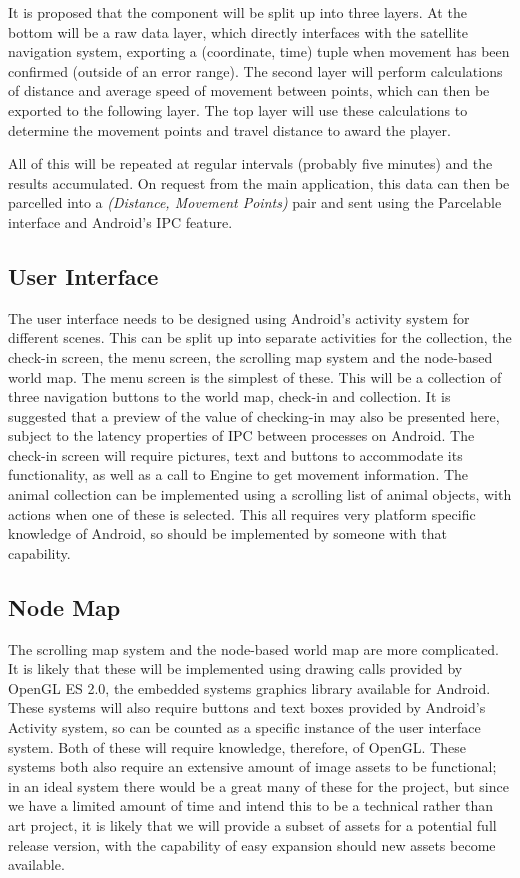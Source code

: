 \documentclass[12pt,a4paper,twoside]{article}
\begin{document}
It is proposed that the component will be split up into three layers.
At the bottom will be a raw data layer, which directly interfaces with the satellite navigation system, exporting a (coordinate, time) tuple when movement has been confirmed (outside of an error range).
The second layer will perform calculations of distance and average speed of movement between points, which can then be exported to the following layer.
The top layer will use these calculations to determine the movement points and travel distance to award the player.


All of this will be repeated at regular intervals (probably five minutes) and the results accumulated.
On request from the main application, this data can then be parcelled into a \textit{(Distance, Movement Points)} pair and sent using the Parcelable interface and Android's IPC feature.

\subsection{User Interface}
The user interface needs to be designed using Android's activity system for different scenes.
This can be split up into separate activities for the collection, the check-in screen, the menu screen, the scrolling map system and the node-based world map.
The menu screen is the simplest of these.
This will be a collection of three navigation buttons to the world map, check-in and collection.
It is suggested that a preview of the value of checking-in may also be presented here, subject to the latency properties of IPC between processes on Android.
The check-in screen will require pictures, text and buttons to accommodate its functionality, as well as a call to Engine to get movement information.
The animal collection can be implemented using a scrolling list of animal objects, with actions when one of these is selected.
This all requires very platform specific knowledge of Android, so should be implemented by someone with that capability.

\subsection{Node Map}
The scrolling map system and the node-based world map are more complicated.
It is likely that these will be implemented using drawing calls provided by OpenGL ES 2.0, the embedded systems graphics library available for Android.
These systems will also require buttons and text boxes provided by Android's Activity system, so can be counted as a specific instance of the user interface system.
Both of these will require knowledge, therefore, of OpenGL.
These systems both also require an extensive amount of image assets to be functional; in an ideal system there would be a great many of these for the project, but since we have a limited amount of time and intend this to be a technical rather than art project, it is likely that we will provide a subset of assets for a potential full release version, with the capability of easy expansion should new assets become available.
\end{document}
